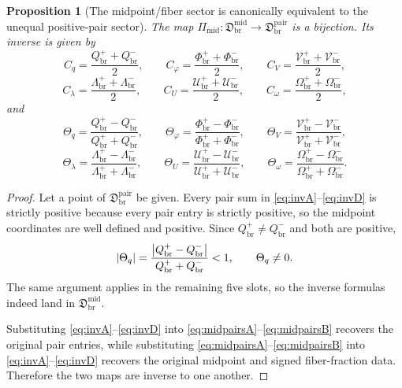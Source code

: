 \documentclass[11pt]{article}
\newcommand{\PairSector}{\mathfrak D_{\mathrm{br}}^{\mathrm{pair}}}
\newcommand{\PairReadPlus}{Q_{\mathrm{br}}^{+}}
\newcommand{\PairReadMinus}{Q_{\mathrm{br}}^{-}}
\newcommand{\PairCovPlus}{\Phi_{\mathrm{br}}^{+}}
\newcommand{\PairCovMinus}{\Phi_{\mathrm{br}}^{-}}
\newcommand{\PairRelaxPlus}{\mathcal V_{\mathrm{br}}^{+}}
\newcommand{\PairRelaxMinus}{\mathcal V_{\mathrm{br}}^{-}}
\newcommand{\PairWellPlus}{\Lambda_{\mathrm{br}}^{+}}
\newcommand{\PairWellMinus}{\Lambda_{\mathrm{br}}^{-}}
\newcommand{\PairEqPlus}{\mathcal U_{\mathrm{br}}^{+}}
\newcommand{\PairEqMinus}{\mathcal U_{\mathrm{br}}^{-}}
\newcommand{\PairScalePlus}{\Omega_{\mathrm{br}}^{+}}
\newcommand{\PairScaleMinus}{\Omega_{\mathrm{br}}^{-}}
\newcommand{\MidFiberSector}{\mathfrak D_{\mathrm{br}}^{\mathrm{mid}}}
\newcommand{\MidPairMap}{\Pi_{\mathrm{mid}}}
\newcommand{\MidRead}{C_{q}}
\newcommand{\MidCov}{C_{\varphi}}
\newcommand{\MidRelax}{C_{V}}
\newcommand{\MidWell}{C_{\lambda}}
\newcommand{\MidEq}{C_{U}}
\newcommand{\MidScale}{C_{\omega}}
\newcommand{\FiberRead}{\Theta_{q}}
\newcommand{\FiberCov}{\Theta_{\varphi}}
\newcommand{\FiberRelax}{\Theta_{V}}
\newcommand{\FiberWell}{\Theta_{\lambda}}
\newcommand{\FiberEq}{\Theta_{U}}
\newcommand{\FiberScale}{\Theta_{\omega}}
\newtheorem{proposition}{Proposition}
\begin{document}
\begin{proposition}[The midpoint/fiber sector is canonically equivalent to the unequal positive-pair sector]
\label{prop:bijection}
The map \(\MidPairMap:\MidFiberSector\to\PairSector\) is a bijection. Its inverse is given by
\begin{equation}
\MidRead=\frac{\PairReadPlus+\PairReadMinus}{2},
\qquad
\MidCov=\frac{\PairCovPlus+\PairCovMinus}{2},
\qquad
\MidRelax=\frac{\PairRelaxPlus+\PairRelaxMinus}{2},
\label{eq:invA}
\end{equation}
\begin{equation}
\MidWell=\frac{\PairWellPlus+\PairWellMinus}{2},
\qquad
\MidEq=\frac{\PairEqPlus+\PairEqMinus}{2},
\qquad
\MidScale=\frac{\PairScalePlus+\PairScaleMinus}{2},
\label{eq:invB}
\end{equation}
and
\begin{equation}
\FiberRead=\frac{\PairReadPlus-\PairReadMinus}{\PairReadPlus+\PairReadMinus},
\qquad
\FiberCov=\frac{\PairCovPlus-\PairCovMinus}{\PairCovPlus+\PairCovMinus},
\qquad
\FiberRelax=\frac{\PairRelaxPlus-\PairRelaxMinus}{\PairRelaxPlus+\PairRelaxMinus},
\label{eq:invC}
\end{equation}
\begin{equation}
\FiberWell=\frac{\PairWellPlus-\PairWellMinus}{\PairWellPlus+\PairWellMinus},
\qquad
\FiberEq=\frac{\PairEqPlus-\PairEqMinus}{\PairEqPlus+\PairEqMinus},
\qquad
\FiberScale=\frac{\PairScalePlus-\PairScaleMinus}{\PairScalePlus+\PairScaleMinus}.
\label{eq:invD}
\end{equation}
\end{proposition}

\begin{proof}
Let a point of \(\PairSector\) be given. Every pair sum in \eqref{eq:invA}--\eqref{eq:invD} is strictly positive because every pair entry is strictly positive, so the midpoint coordinates are well defined and positive. Since \(\PairReadPlus\neq\PairReadMinus\) and both are positive,
\[
\abs{\FiberRead}
=
\frac{\abs{\PairReadPlus-\PairReadMinus}}{\PairReadPlus+\PairReadMinus}
<1,
\qquad
\FiberRead\neq0.
\]
The same argument applies in the remaining five slots, so the inverse formulas indeed land in \(\MidFiberSector\).

Substituting \eqref{eq:invA}--\eqref{eq:invD} into \eqref{eq:midpairsA}--\eqref{eq:midpairsB} recovers the original pair entries, while substituting \eqref{eq:midpairsA}--\eqref{eq:midpairsB} into \eqref{eq:invA}--\eqref{eq:invD} recovers the original midpoint and signed fiber-fraction data. Therefore the two maps are inverse to one another.
\end{proof}
\end{document}
